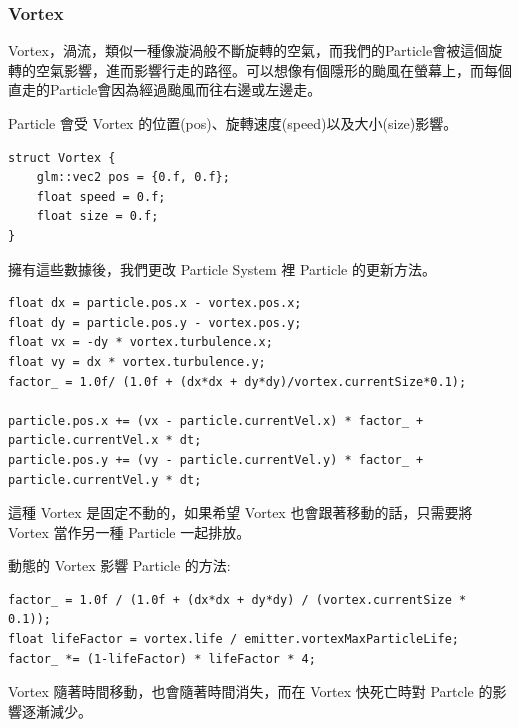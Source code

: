\subsubsection{Vortex}

Vortex，渦流，類似一種像漩渦般不斷旋轉的空氣，而我們的Particle會被這個旋轉的空氣影響，進而影響行走的路徑。可以想像有個隱形的颱風在螢幕上，而每個直走的Particle會因為經過颱風而往右邊或左邊走。

Particle 會受 Vortex 的位置(pos)、旋轉速度(speed)以及大小(size)影響。

\begin{lstlisting}
struct Vortex {
    glm::vec2 pos = {0.f, 0.f};
    float speed = 0.f;
    float size = 0.f;
}
\end{lstlisting}

擁有這些數據後，我們更改 Particle System 裡 Particle 的更新方法。

\begin{lstlisting}
float dx = particle.pos.x - vortex.pos.x;
float dy = particle.pos.y - vortex.pos.y;
float vx = -dy * vortex.turbulence.x;
float vy = dx * vortex.turbulence.y;
factor_ = 1.0f/ (1.0f + (dx*dx + dy*dy)/vortex.currentSize*0.1);

particle.pos.x += (vx - particle.currentVel.x) * factor_ + particle.currentVel.x * dt;
particle.pos.y += (vy - particle.currentVel.y) * factor_ + particle.currentVel.y * dt;
\end{lstlisting}

這種 Vortex 是固定不動的，如果希望 Vortex 也會跟著移動的話，只需要將 Vortex 當作另一種 Particle 一起排放。

動態的 Vortex 影響 Particle 的方法:

\begin{lstlisting}
factor_ = 1.0f / (1.0f + (dx*dx + dy*dy) / (vortex.currentSize * 0.1));
float lifeFactor = vortex.life / emitter.vortexMaxParticleLife;
factor_ *= (1-lifeFactor) * lifeFactor * 4;
\end{lstlisting}

Vortex 隨著時間移動，也會隨著時間消失，而在 Vortex 快死亡時對 Partcle 的影響逐漸減少。


